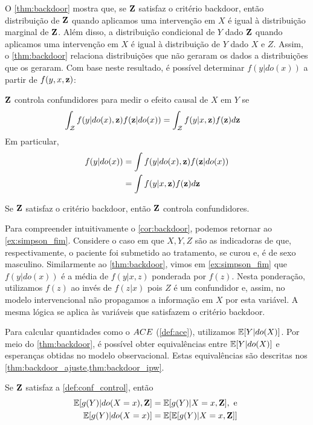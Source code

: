 O \cref{thm:backdoor} mostra que,
se ${\mathbf{Z}}$ satisfaz o critério backdoor, então
distribuição de ${\mathbf{Z}}$ quando
aplicamos uma intervenção em $X$ é igual
à distribuição marginal de ${\mathbf{Z}}$.
Além disso, a distribuição condicional de
$Y$ dado ${\mathbf{Z}}$ quando aplicamos uma intervenção em $X$ é igual 
à distribuição de $Y$ dado $X$ e $Z$.
Assim, o \cref{thm:backdoor} relaciona
distribuições que não geraram os dados a 
distribuições que os geraram.
Com base neste resultado, é possível determinar
$f(y|do(x))$ a partir de $f(y,x,{\mathbf{z}})$:

\begin{definition}
 \label{def:conf_control}
 ${\mathbf{Z}}$ controla confundidores para
 medir o efeito causal de $X$ em $Y$ se
 \begin{align*}
  \int_{\mathcal{Z}} f(y|do(x),{\mathbf{z}})f({\mathbf{z}}|do(x)) 
  &= \int_{\mathcal{Z}} f(y|x,{\mathbf{z}})f({\mathbf{z}}) d{\mathbf{z}}
 \end{align*}
 Em particular,
 \begin{align*}
  f(y|do(x)) &= \int f(y|do(x),{\mathbf{z}})f({\mathbf{z}}|do(x)) \\
  &= \int f(y|x,{\mathbf{z}})f({\mathbf{z}}) d{\mathbf{z}}
 \end{align*}
\end{definition}

\begin{corollary}
 \label{cor:backdoor}
 Se ${\mathbf{Z}}$ satisfaz o critério backdoor, então
 ${\mathbf{Z}}$ controla confundidores.
\end{corollary}

Para compreender intuitivamente o \cref{cor:backdoor},
podemos retornar ao \cref{ex:simpson_fim}.
Considere o caso em que $X, Y, Z$ são as indicadoras de que,
respectivamente, o paciente foi submetido ao tratamento,
se curou e, é de sexo masculino.
Similarmente ao \cref{thm:backdoor},
vimos em \cref{ex:simpson_fim} que $f(y|do(x))$ é
a média de $f(y|x,z)$ ponderada por $f(z)$.
Nesta ponderação, utilizamos $f(z)$ 
ao invés de $f(z|x)$ pois $Z$ é um confundidor e,
assim, no modelo intervencional não propagamos
a informação em $X$ por esta variável.
A mesma lógica se aplica 
às variáveis que satisfazem o critério backdoor.

Para calcular quantidades 
como o ${ACE}$ (\cref{def:ace}), 
utilizamos ${\mathbb E}[Y|do(X)]$.
Por meio do \cref{thm:backdoor},
é possível obter equivalências entre
${\mathbb E}[Y|do(X)]$ e esperanças obtidas
no modelo observacional.
Estas equivalências são descritas
nos \cref{thm:backdoor_ajuste,thm:backdoor_ipw}.

\begin{theorem}
 \label{thm:backdoor_ajuste}
 Se ${\mathbf{Z}}$ satisfaz 
 a \cref{def:conf_control}, então
 \begin{align*}
  {\mathbb E}[g(Y)|do(X=x),{\mathbf{Z}}]
  &= {\mathbb E}[g(Y)|X=x,{\mathbf{Z}}], \text{ e } \\
  {\mathbb E}[g(Y)|do(X=x)] 
  &= {\mathbb E}[{\mathbb E}[g(Y)|X=x,{\mathbf{Z}}]]
 \end{align*}
\end{theorem}

